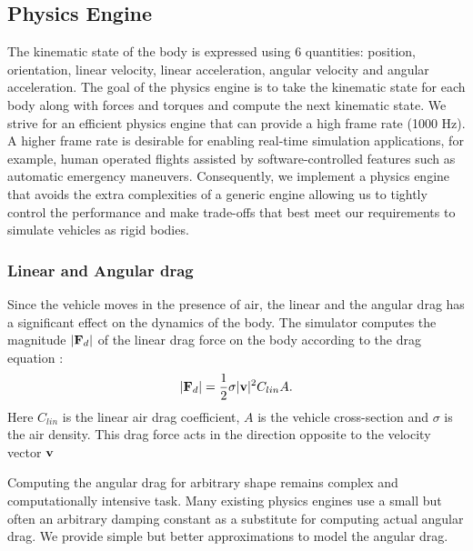 \documentclass[graybox]{svmult}
\begin{document}
\subsection{Physics Engine}
The kinematic state of the body is expressed using 6 quantities: position, orientation, linear velocity, linear acceleration, angular velocity and angular acceleration. The goal of the physics engine is to take the kinematic state for each body along with forces and torques and compute the next kinematic state. We strive for an efficient physics engine that can provide a high frame rate (1000 Hz). A higher frame rate is desirable for enabling real-time simulation applications, for example, human operated flights assisted by software-controlled features such as automatic emergency maneuvers. Consequently, we implement a physics engine that avoids the extra complexities of a generic engine allowing us to tightly control the performance and make trade-offs that best meet our requirements to simulate vehicles as rigid bodies.

\subsubsection{Linear and Angular drag}
Since the vehicle moves in the presence of air, the linear and the angular drag has a significant effect on the dynamics of the body. The simulator computes the magnitude $|{\bf F}_d|$ of the linear drag force on the body according to the drag equation \cite{taylor2005classical}:
\begin{equation*}
|{\bf F}_d| = \frac{1}{2}\sigma |{\bf v}|^2 C_{lin} A.
\end{equation*}
Here $C_{lin}$ is the linear air drag coefficient, $A$ is the vehicle cross-section and $\sigma$ is the air density. This drag force acts in the direction opposite to the velocity vector ${\bf v}$

Computing the angular drag for arbitrary shape remains complex and computationally intensive task. Many existing physics engines use a small but often an arbitrary damping constant as a substitute for computing actual angular drag. We provide simple but better approximations to model the angular drag.
\end{document}
